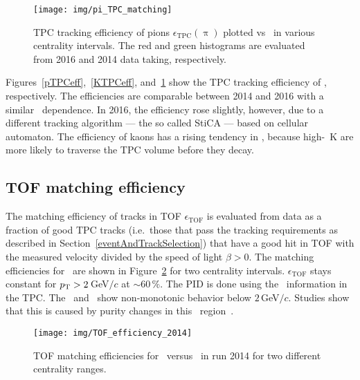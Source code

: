 \begin{figure}[!htb]
\centering
\vspace{-0.2cm}
\texttt{[image: img/pi\_TPC\_matching]}
\vspace{-0.8cm}
\caption{\label{piTPCeff} TPC tracking efficiency of pions $\epsilon_\mathrm{TPC}(\uppi)$ plotted vs \pt\ in various centrality intervals. The red and green histograms are evaluated from 2016 and 2014 data taking, respectively.}

\end{figure}

Figures~\ref{pTPCeff},~\ref{KTPCeff}, and~\ref{piTPCeff} show the TPC tracking efficiency of \pKandpi, respectively. The efficiencies are comparable between 2014 and 2016 with a similar \pt\ dependence. In 2016, the efficiency rose slightly, however, due to a different tracking algorithm --- the so called StiCA --- based on cellular automaton. The efficiency of kaons has a rising tendency in \pt, because high-\pt\ K are more likely to traverse the TPC volume before they decay.

\subsection{TOF matching efficiency\label{tofEff}}

The matching efficiency of tracks in TOF $\epsilon_\mathrm{TOF}$ is evaluated from data as a fraction of good TPC tracks (i.e.\ those that pass the tracking requirements as described in Section~\ref{eventAndTrackSelection}) that have a good hit in TOF with the measured velocity divided by the speed of light $\beta > 0$\@. The matching efficiencies for \pKandpi\ are shown in Figure~\ref{tof2014} for two centrality intervals. $\epsilon_\mathrm{TOF}$ stays constant for ${p_{\mathrm{T}}} > 2\,$GeV$/c$ at $\sim60\,\%$\@. The PID is done using the \dedx\ information in the TPC\@. The \ppm\ and \Kmp\ show non-monotonic behavior below $2\,$GeV$/c$. Studies show that this is caused by purity changes in this \pt\ region~\cite{D0paper}\@. 

\begin{figure}[!htb]
\centering
\vspace{-0.2cm}
\texttt{[image: img/TOF\_efficiency\_2014]}
\vspace{-0.8cm}
\caption{\label{tof2014} TOF matching efficiencies for \pKandpi\ versus \pt\ in run 2014 for two different centrality ranges.}
\end{figure}

